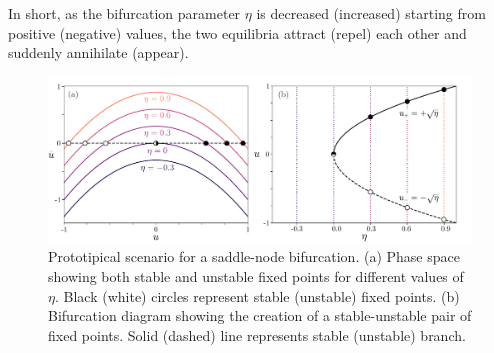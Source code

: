 In short, as the bifurcation parameter $\eta$ is decreased (increased)
starting from positive (negative) values, the two equilibria attract (repel) each other and suddenly annihilate (appear).

\begin{figure}[h]
    \centering
    \includegraphics[width=\textwidth]{imagenes/framework/bif_sn_f.pdf}
    \caption{Prototipical scenario for a saddle-node bifurcation. (a) Phase space
    showing both stable and unstable fixed points for different values of $\eta$. 
    Black (white) circles represent
    stable (unstable) fixed points. (b) Bifurcation diagram showing
    the creation of a stable-unstable pair of fixed points. Solid (dashed) line represents
    stable (unstable) branch.}
    \label{fig:pre_bifs_sn}
\end{figure}

